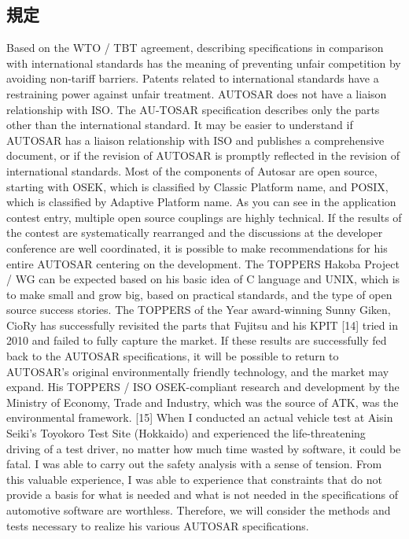 \documentclass[twocolumn]{article} %
\begin{document}
\subsection{規定}
Based on the WTO / TBT agreement, describing specifications in comparison with international standards has the meaning of preventing unfair competition by avoiding non-tariff barriers. Patents related to international standards have a restraining power against unfair treatment.
AUTOSAR does not have a liaison relationship with ISO. The AU-TOSAR specification describes only the parts other than the international standard. It may be easier to understand if AUTOSAR has a liaison relationship with ISO and publishes a comprehensive document, or if the revision of AUTOSAR is promptly reflected in the revision of international standards.
Most of the components of Autosar are open source, starting with OSEK, which is classified by Classic Platform name, and POSIX, which is classified by Adaptive Platform name. As you can see in the application contest entry, multiple open source couplings are highly technical. If the results of the contest are systematically rearranged and the discussions at the developer conference are well coordinated, it is possible to make recommendations for his entire AUTOSAR centering on the development. The TOPPERS Hakoba Project / WG can be expected based on his basic idea of C language and UNIX, which is to make small and grow big, based on practical standards, and the type of open source success stories.
The TOPPERS of the Year award-winning Sunny Giken, CioRy has successfully revisited the parts that Fujitsu and his KPIT [14] tried in 2010 and failed to fully capture the market. If these results are successfully fed back to the AUTOSAR specifications, it will be possible to return to AUTOSAR's original environmentally friendly technology, and the market may expand. His TOPPERS / ISO OSEK-compliant research and development by the Ministry of Economy, Trade and Industry, which was the source of ATK, was the environmental framework. [15] When I conducted an actual vehicle test at Aisin Seiki's Toyokoro Test Site (Hokkaido) and experienced the life-threatening driving of a test driver, no matter how much time wasted by software, it could be fatal. I was able to carry out the safety analysis with a sense of tension. From this valuable experience, I was able to experience that constraints that do not provide a basis for what is needed and what is not needed in the specifications of automotive software are worthless. Therefore, we will consider the methods and tests necessary to realize his various AUTOSAR specifications.
\end{document}

